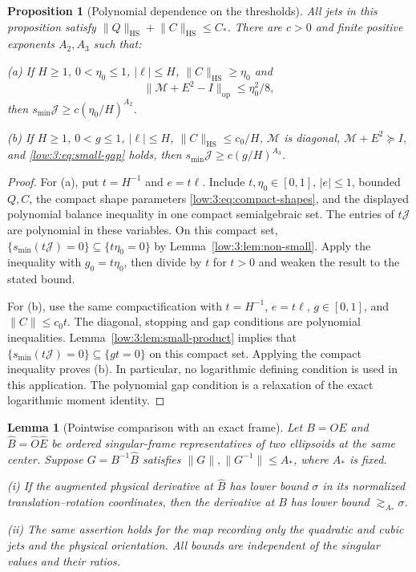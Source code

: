 \documentclass[11pt]{amsart}
\newtheorem{proposition}[theorem]{Proposition}
\newtheorem{lemma}[theorem]{Lemma}
\theoremstyle{definition}
\theoremstyle{remark}
\newcommand{\norm}[1]{\lVert #1\rVert}
\newcommand{\abs}[1]{\lvert #1\rvert}
\numberwithin{equation}{section}
\begin{document}
\begin{proposition}[Polynomial dependence on the thresholds]\label{low:3:prop:quantitative}
All jets in this proposition satisfy $\norm Q_{\mathrm{HS}}+\norm C_{\mathrm{HS}}\leq C_*$. There are $c>0$ and finite positive exponents $A_2,A_3$ such that:

\smallskip\noindent
(a) If $H\geq1$, $0<\eta_0\leq1$, $\abs\ell\leq H$, $\norm C_{\mathrm{HS}}\geq\eta_0$ and
\[
\norm{\mathscr M+E^2-I}_{\mathrm{op}}\leq\eta_0^2/8,
\]
then $s_{\min}\mathcal J\geq c(\eta_0/H)^{A_2}$.

\smallskip\noindent
(b) If $H\geq1$, $0<g\leq1$, $\abs\ell\leq H$, $\norm C_{\mathrm{HS}}\leq c_0/H$, $\mathscr M$ is diagonal, $\mathscr M+E^2\succeq I$, and \eqref{low:3:eq:small-gap} holds, then $s_{\min}\mathcal J\geq c(g/H)^{A_3}$.
\end{proposition}

\begin{proof}
For (a), put $t=H^{-1}$ and $e=t\ell$. Include $t,\eta_0\in[0,1]$, $\abs e\leq1$, bounded $Q,C$, the compact shape parameters \eqref{low:3:eq:compact-shapes}, and the displayed polynomial balance inequality in one compact semialgebraic set. The entries of $t\mathcal J$ are polynomial in these variables. On this compact set, $\{s_{\min}(t\mathcal J)=0\}\subseteq\{t\eta_0=0\}$ by Lemma~\ref{low:3:lem:non-small}. Apply the inequality with $g_0=t\eta_0$, then divide by $t$ for $t>0$ and weaken the result to the stated bound.

For (b), use the same compactification with $t=H^{-1}$, $e=t\ell$, $g\in[0,1]$, and $\norm C\leq c_0t$. The diagonal, stopping and gap conditions are polynomial inequalities. Lemma~\ref{low:3:lem:small-product} implies that $\{s_{\min}(t\mathcal J)=0\}\subseteq\{gt=0\}$ on this compact set. Applying the compact inequality proves (b). In particular, no logarithmic defining condition is used in this application. The polynomial gap condition is a relaxation of the exact logarithmic moment identity.
\end{proof}

\begin{lemma}[Pointwise comparison with an exact frame]\label{low:3:lem:reference-transfer}
Let $B=OE$ and $\widehat B=\widehat O\widehat E$ be ordered singular-frame representatives of two ellipsoids at the same center. Suppose $G=B^{-1}\widehat B$ satisfies $\norm G,\norm{G^{-1}}\leq A_*$, where $A_*$ is fixed.

\noindent\textup{(i)} If the augmented physical derivative at $\widehat B$ has lower bound $\sigma$ in its normalized translation--rotation coordinates, then the derivative at $B$ has lower bound $\gtrsim_{A_*}\sigma$.

\noindent\textup{(ii)} The same assertion holds for the map recording only the quadratic and cubic jets and the physical orientation. All bounds are independent of the singular values and their ratios.
\end{lemma}
\end{document}
